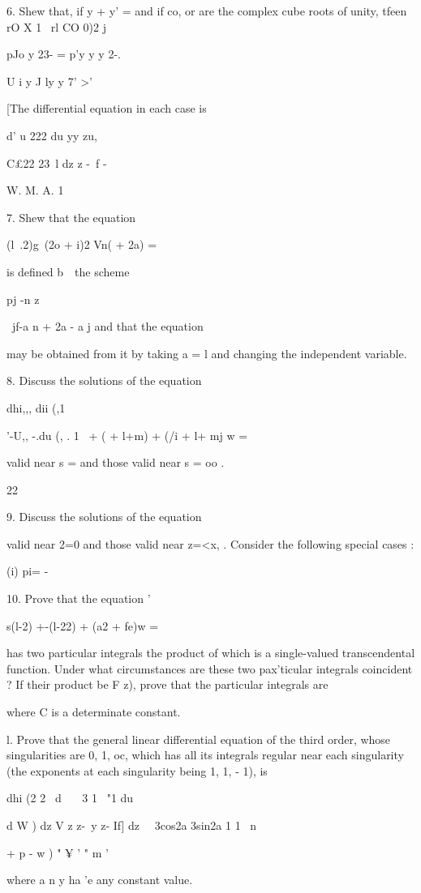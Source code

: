 6. Shew that, if y + y' = and if co, or are the complex cube roots of
unity, tfeen rO X 1 \ rl CO 0)2 j

pJo y 23- = p'y y y 2-. 

U i y J ly y 7' >'

[The differential equation in each case is

d' u 222 du yy zu,

C£22 23\ l dz z -\ f -

W. M. A. 1

%
%

7. Shew that the equation

(l\ .2)g\ (2o + i)2 Vn( + 2a) =

is defined b\ \ the scheme

pj -n z

\ jf-a n + 2a - a j and that the equation

may be obtained from it by taking a = l and changing the independent
variable.

8. Discuss the solutions of the equation

dhi,,, dii (,1


'-U,, -.du (, . 1 \ + ( + l+m) + (/i + l+ mj w =

valid near s = and those valid near s = oo . 

 22

9. Discuss the solutions of the equation

valid near 2=0 and those valid near z=<x, . Consider the following
special cases :

(i) pi= -%

10. Prove that the equation '

s(l-2) +-(l-22) + (a2 + fe)w =

has two particular integrals the product of which is a single-valued
transcendental function. Under what circumstances are these two
pax'ticular integrals coincident ? If their product be F z), prove
that the particular integrals are

where C is a determinate constant.

l. Prove that the general linear differential equation of the third
order, whose singularities are 0, 1, oc, which has all its integrals
regular near each singularity (the exponents at each singularity being
1, 1, - 1), is

dhi (2 2 \ d \ \ \ 3 1 \ "1 du

d W ) dz V z z-\ y z- If] dz \ \ 3cos2a 3sin2a 1 1 \ n

+ p - w ) " ¥ ' " m '

where a n y ha 'e any constant value. 
